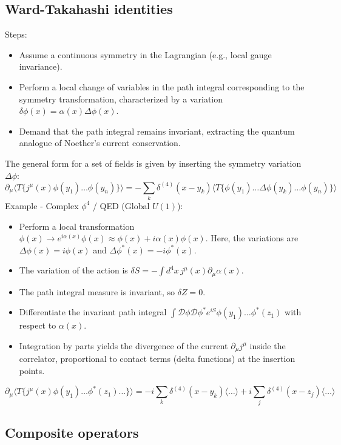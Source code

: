 \documentclass{article}
\begin{document}
\subsection{Ward-Takahashi identities}
Steps:
\begin{itemize}
    \item Assume a continuous symmetry in the Lagrangian (e.g., local gauge invariance).
    \item Perform a local change of variables in the path integral corresponding to the symmetry transformation, characterized by a variation $\delta\phi(x) = \alpha(x)\Delta\phi(x)$.
    \item Demand that the path integral remains invariant, extracting the quantum analogue of Noether's current conservation.
\end{itemize}
The general form for a set of fields is given by inserting the symmetry variation $\Delta \phi$:
\begin{equation}
    \partial_\mu \langle T\{j^\mu(x) \phi(y_1) \dots \phi(y_n)\} \rangle = -\sum_k \delta^{(4)}(x - y_k) \langle T\{\phi(y_1) \dots \Delta \phi(y_k) \dots \phi(y_n)\} \rangle
\end{equation}
Example - Complex $\phi^4$ / QED (Global $U(1)$):
\begin{itemize}
    \item Perform a local transformation $\phi(x) \to e^{i\alpha(x)}\phi(x) \approx \phi(x) + i\alpha(x)\phi(x)$. Here, the variations are $\Delta \phi(x) = i\phi(x)$ and $\Delta \phi^*(x) = -i\phi^*(x)$.
    \item The variation of the action is $\delta S = -\int d^4x \, j^\mu(x) \partial_\mu \alpha(x)$.
    \item The path integral measure is invariant, so $\delta Z = 0$.
    \item Differentiate the invariant path integral $\int \mathcal{D}\phi \mathcal{D}\phi^* e^{iS} \phi(y_1)\dots\phi^*(z_1)$ with respect to $\alpha(x)$.
    \item Integration by parts yields the divergence of the current $\partial_\mu j^\mu$ inside the correlator, proportional to contact terms (delta functions) at the insertion points.
\end{itemize}
\begin{equation}
    \partial_\mu \langle T\{j^\mu(x) \phi(y_1) \dots \phi^*(z_1) \dots \} \rangle = -i \sum_k \delta^{(4)}(x - y_k) \langle \dots \rangle + i \sum_j \delta^{(4)}(x - z_j) \langle \dots \rangle
\end{equation}
\subsection{Composite operators}
\end{document}
